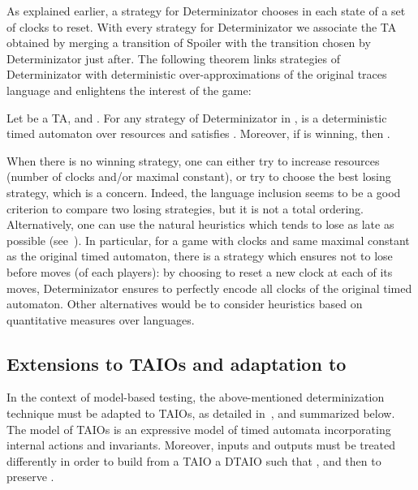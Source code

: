 \documentclass{LMCS}
\theoremstyle{plain}\newtheorem{proposition}[thm]{Proposition}
\begin{document}
As explained earlier, a strategy for Determinizator chooses in each
state of  a set  of clocks to reset.  With
every strategy  for Determinizator we associate the TA
 obtained by merging a transition of Spoiler
with the transition chosen by Determinizator just after.  The
following theorem links strategies of Determinizator with
deterministic over-approximations of the original traces language and
enlightens the interest of the game:
\begin{thm}
\label{th:game}Let  be a TA, and . For any
strategy  of Determinizator in
,  is a
deterministic timed automaton over resources  and satisfies
. 
Moreover, if  is winning, then
.
\end{thm}
When there is no winning strategy, one can either try to increase
  resources (number of clocks and/or maximal constant), or try to
  choose the best losing strategy, which is a concern.  Indeed, the
  language inclusion seems to be a good criterion to compare two
  losing strategies, but it is not a total ordering.  Alternatively,
  one can use the natural heuristics which tends to lose as late as
  possible (see~\cite{BertrandStainerJeronKrichen-RR2010}).  In
  particular, for a game with  clocks and same maximal constant as
  the original timed automaton, there is a strategy which ensures not
  to lose before  moves (of each players): by choosing to reset a
  new clock at each of its moves, Determinizator ensures 
to perfectly  encode all clocks of the original timed automaton. 
Other
  alternatives would be to consider heuristics based on quantitative
  measures over languages.


\subsection{Extensions to TAIOs and adaptation to \tioco}
In the context of model-based testing, the above-mentioned
determinization technique must be adapted to TAIOs, as detailed
in~\cite{BertrandStainerJeronKrichen-RR2010}, and summarized below.  
The model of TAIOs
is an expressive model of timed automata incorporating internal actions and
invariants.  
Moreover, inputs and outputs must be treated differently
in order to build
from a TAIO  a DTAIO  such that ,
and then to preserve \tioco.


\end{document}
